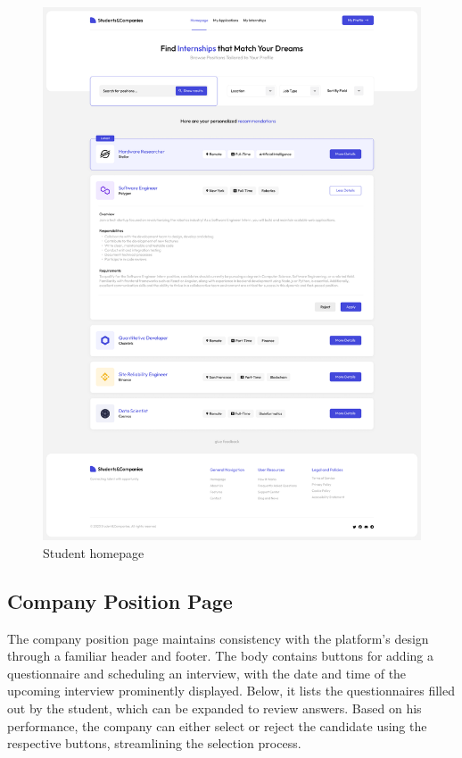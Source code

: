 \begin{figure}
    \centering
    \includegraphics[width=15cm]{images/selected-pages/student-homepage.png}
    \caption{Student homepage}
\end{figure}

\subsection{Company Position Page}
The company position page maintains consistency with the platform's design through a familiar header and footer.
The body contains buttons for adding a questionnaire and scheduling an interview, with the date and time of the upcoming interview prominently displayed.
Below, it lists the questionnaires filled out by the student, which can be expanded to review answers.
Based on his performance, the company can either select or reject the candidate using the respective buttons, streamlining the selection process.

